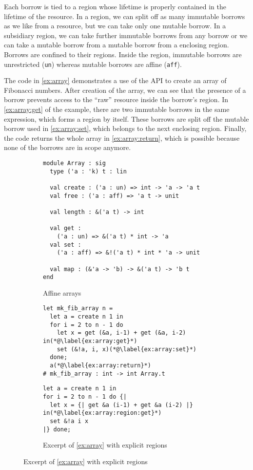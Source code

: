 Each borrow is tied to a region whose lifetime is properly
contained in the lifetime of the resource. 
In a region, we can split off as many immutable borrows as we like
from a resource, but we can take only one mutable borrow. In a
subsidiary region, we can take further immutable borrows from any
borrow or we can take a mutable borrow from a mutable borrow from a
enclosing region. Borrows are confined to their regions. Inside the region,
immutable borrows are unrestricted (\lstinline/un/) whereas mutable
borrows are affine (\lstinline/aff/).

The code in \cref{ex:array} demonstrates a use of the API to create an
array of Fibonacci numbers. After creation of the array, we can see
that the presence of a borrow prevents access to the ``raw'' 
resource inside the borrow's region. In \cref{ex:array:get} of the
example, there are two immutable borrows in the same
expression, which forms a region by itself. These borrows are split
off the mutable borrow used in \cref{ex:array:set}, which belongs to
the next enclosing region.
Finally, the code returns the whole array in \cref{ex:array:return},
which is possible because none of the borrows are in scope anymore.

\begin{figure}[tp]
  \centering
  \begin{subfigure}[t]{0.48\linewidth}
\begin{lstlisting}
module Array : sig
  type ('a : 'k) t : lin
  
  val create : ('a : un) => int -> 'a -> 'a t
  val free : ('a : aff) => 'a t -> unit

  val length : &('a t) -> int

  val get :
    ('a : un) => &('a t) * int -> 'a
  val set :
    ('a : aff) => &!('a t) * int * 'a -> unit
  
  val map : (&'a -> 'b) -> &('a t) -> 'b t
end
\end{lstlisting}
    \caption{Affine arrays}
    \label{sig:array}
  \end{subfigure}\hfill
  \begin{subfigure}[t]{0.5\linewidth}
\begin{lstlisting}
let mk_fib_array n =
  let a = create n 1 in
  for i = 2 to n - 1 do
    let x = get (&a, i-1) + get (&a, i-2) in(*@\label{ex:array:get}*)
    set (&!a, i, x)(*@\label{ex:array:set}*)
  done;
  a(*@\label{ex:array:return}*)
# mk_fib_array : int -> int Array.t
\end{lstlisting}
    \caption{Example of use of affine arrays}
    \label{ex:array}
\begin{lstlisting}
let a = create n 1 in
for i = 2 to n - 1 do {|
  let x = {| get &a (i-1) + get &a (i-2) |} in(*@\label{ex:array:region:get}*)
  set &!a i x
|} done;
\end{lstlisting}
    \caption{Excerpt of \cref{ex:array} with explicit regions}
    \label{ex:array:region}
  \end{subfigure}
\end{figure}


